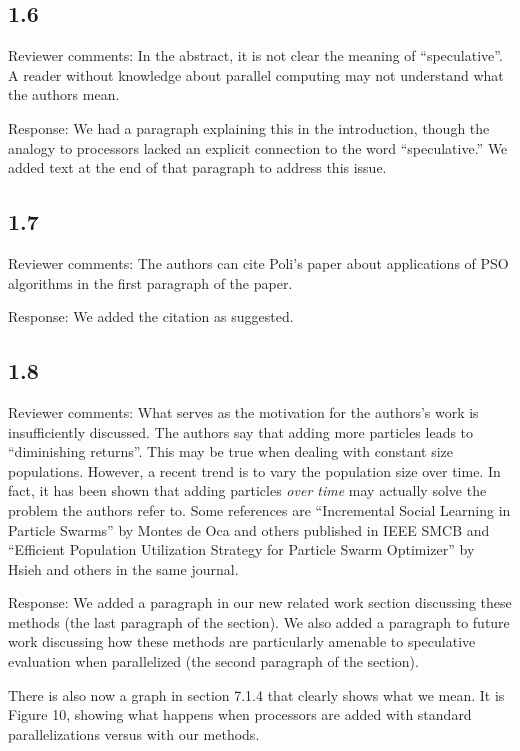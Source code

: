 \documentclass[onecolumn, 12pt]{article}
\begin{document}
\subsection*{1.6}

Reviewer comments: In the abstract, it is not clear the meaning of
``speculative''. A reader without knowledge about parallel computing may not
understand what the authors mean.

Response: We had a paragraph explaining this in the introduction, though the
analogy to processors lacked an explicit connection to the word
``speculative.''  We added text at the end of that paragraph to address this
issue.

\subsection*{1.7}

Reviewer comments: The authors can cite Poli's paper about applications of PSO
algorithms in the first paragraph of the paper.

Response: We added the citation as suggested.

\subsection*{1.8}

Reviewer comments: What serves as the motivation for the authors's work is
insufficiently discussed.  The authors say that adding more particles leads to
``diminishing returns''. This may be true when dealing with constant size
populations.  However, a recent trend is to vary the population size over time.
In fact, it has been shown that adding particles \emph{over time} may actually
solve the problem the authors refer to. Some references are ``Incremental
Social Learning in Particle Swarms'' by Montes de Oca and others published in
IEEE SMCB and ``Efficient Population Utilization Strategy for Particle Swarm
Optimizer'' by Hsieh and others in the same journal.

Response: We added a paragraph in our new related work section discussing these
methods (the last paragraph of the section).  We also added a paragraph to
future work discussing how these methods are particularly amenable to
speculative evaluation when parallelized (the second paragraph of the section).

There is also now a graph in section 7.1.4 that clearly shows what we mean.  It
is Figure 10, showing what happens when processors are added with standard
parallelizations versus with our methods.
\end{document}
